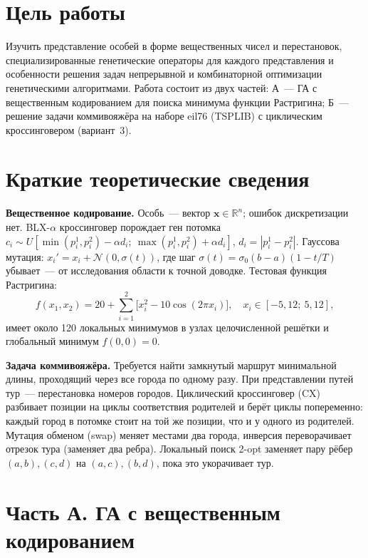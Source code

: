\documentclass[14pt,a4paper]{extarticle}
\begin{document}

\section{Цель работы}

Изучить представление особей в форме вещественных чисел и перестановок, специализированные генетические операторы для каждого представления и особенности решения задач непрерывной и комбинаторной оптимизации генетическими алгоритмами. Работа состоит из двух частей: А~--- ГА с вещественным кодированием для поиска минимума функции Растригина; Б~--- решение задачи коммивояжёра на наборе eil76 (TSPLIB) с циклическим кроссинговером (вариант~3).

\section{Краткие теоретические сведения}

\textbf{Вещественное кодирование.} Особь~--- вектор $\mathbf{x} \in \mathbb{R}^n$; ошибок дискретизации нет. BLX-$\alpha$ кроссинговер порождает ген потомка $c_i \sim U[\min(p_i^1, p_i^2) - \alpha d_i;\ \max(p_i^1, p_i^2) + \alpha d_i]$, $d_i = |p_i^1 - p_i^2|$. Гауссова мутация: $x_i' = x_i + \mathcal{N}(0, \sigma(t))$, где шаг $\sigma(t) = \sigma_0 (b - a)(1 - t/T)$ убывает~--- от исследования области к точной доводке. Тестовая функция Растригина:
\begin{equation}
f(x_1, x_2) = 20 + \sum_{i=1}^{2}\bigl[x_i^2 - 10\cos(2\pi x_i)\bigr], \quad x_i \in [-5{,}12;\ 5{,}12],
\end{equation}
имеет около 120 локальных минимумов в узлах целочисленной решётки и глобальный минимум $f(0, 0) = 0$.

\textbf{Задача коммивояжёра.} Требуется найти замкнутый маршрут минимальной длины, проходящий через все города по одному разу. При представлении путей тур~--- перестановка номеров городов. Циклический кроссинговер (CX) разбивает позиции на циклы соответствия родителей и берёт циклы попеременно: каждый город в потомке стоит на той же позиции, что и у одного из родителей. Мутация обменом (swap) меняет местами два города, инверсия переворачивает отрезок тура (заменяет два ребра). Локальный поиск 2-opt заменяет пару рёбер $(a, b), (c, d)$ на $(a, c), (b, d)$, пока это укорачивает тур.

\section{Часть А. ГА с вещественным кодированием}
\end{document}
